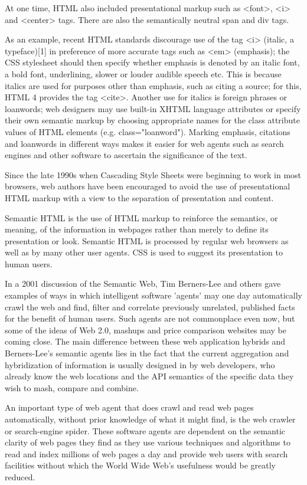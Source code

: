 At one time, HTML also included presentational markup such as <font>, <i> and <center> tags. There are also the semantically neutral span and div tags. 

As an example, recent HTML standards discourage use of the tag <i> (italic, a typeface)[1] in preference of more accurate tags such as <em> (emphasis); the CSS stylesheet should then specify whether emphasis is denoted by an italic font, a bold font, underlining, slower or louder audible speech etc. This is because italics are used for purposes other than emphasis, such as citing a source; for this, HTML 4 provides the tag <cite>. Another use for italics is foreign phrases or loanwords; web designers may use built-in XHTML language attributes or specify their own semantic markup by choosing appropriate names for the class attribute values of HTML elements (e.g. class="loanword"). Marking emphasis, citations and loanwords in different ways makes it easier for web agents such as search engines and other software to ascertain the significance of the text.



Since the late 1990s when Cascading Style Sheets were beginning to work in most browsers, web authors have been encouraged to avoid the use of presentational HTML markup with a view to the separation of presentation and content.

Semantic HTML is the use of HTML markup to reinforce the semantics, or meaning, of the information in webpages rather than merely to define its presentation or look. Semantic HTML is processed by regular web browsers as well as by many other user agents. CSS is used to suggest its presentation to human users.

In a 2001 discussion of the Semantic Web, Tim Berners-Lee and others gave examples of ways in which intelligent software 'agents' may one day automatically crawl the web and find, filter and correlate previously unrelated, published facts for the benefit of human users. Such agents are not commonplace even now, but some of the ideas of Web 2.0, mashups and price comparison websites may be coming close. The main difference between these web application hybrids and Berners-Lee's semantic agents lies in the fact that the current aggregation and hybridization of information is usually designed in by web developers, who already know the web locations and the API semantics of the specific data they wish to mash, compare and combine.



An important type of web agent that does crawl and read web pages automatically, without prior knowledge of what it might find, is the web crawler or search-engine spider. These software agents are dependent on the semantic clarity of web pages they find as they use various techniques and algorithms to read and index millions of web pages a day and provide web users with search facilities without which the World Wide Web's usefulness would be greatly reduced.


